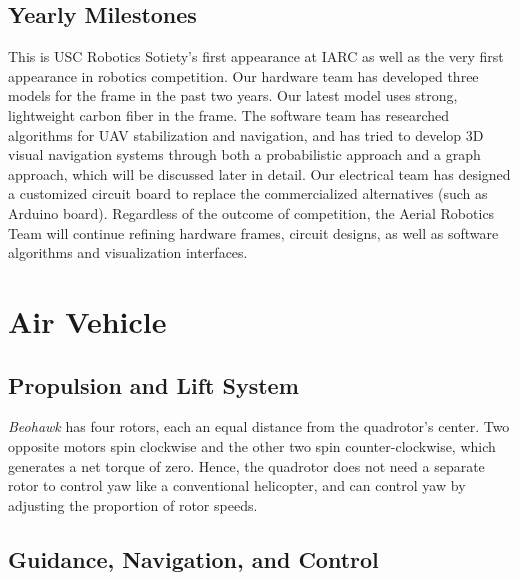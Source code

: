 \documentclass[12pt, letterpaper]{article}
\begin{document}
\subsection{Yearly Milestones}

This is USC Robotics Sotiety's first appearance at IARC as well as the very first appearance in robotics competition. Our hardware team has developed three models for the frame in the past two years. Our latest model uses strong, lightweight carbon fiber in the frame. The software team has researched algorithms for UAV stabilization and navigation, and has tried to develop 3D visual navigation systems through both a probabilistic approach and a graph approach,  which will be discussed later in detail. Our electrical team has designed a customized circuit board to replace the commercialized alternatives (such as Arduino board). Regardless of the outcome of competition, the Aerial Robotics Team will continue refining hardware frames, circuit designs, as well as software algorithms and visualization interfaces.


\section{Air Vehicle}

\subsection{Propulsion and Lift System}
\emph{Beohawk} has four rotors, each an equal distance from the quadrotor's center.  Two opposite motors spin clockwise and the other two spin counter-clockwise, which generates a net torque of zero.  Hence, the quadrotor does not need a separate rotor to control yaw like a conventional helicopter, and can control yaw by adjusting the proportion of rotor speeds.   

\subsection{Guidance, Navigation, and Control}
\end{document}
